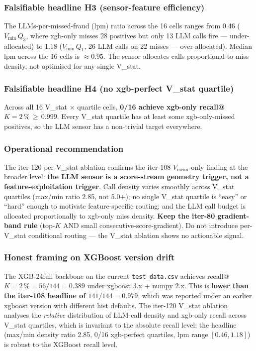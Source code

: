 \subsubsection{Falsifiable headline H3 (sensor-feature efficiency)}
The LLMs-per-missed-fraud (lpm) ratio across the 16 cells ranges from
0.46 ($V_\mathrm{min}\,Q_3$, where xgb-only misses 28 positives but
only 13 LLM calls fire --- under-allocated) to 1.18 ($V_\mathrm{min}\,Q_1$,
26 LLM calls on 22 misses --- over-allocated).  Median lpm across the
16 cells is $\approx 0.95$.  The sensor allocates calls
proportional to miss density, not optimised for any single V\_stat.

\subsubsection{Falsifiable headline H4 (no xgb-perfect V\_stat quartile)}
Across all 16 V\_stat$\,\times\,$quartile cells, \textbf{0/16 achieve
xgb-only recall@$K{=}2\,\%\,\geq\,0.999$}.  Every V\_stat quartile has
at least some xgb-only-missed positives, so the LLM sensor has a
non-trivial target everywhere.

\subsubsection{Operational recommendation}
The iter-120 per-V\_stat ablation confirms the iter-108 $V_\mathrm{mean}$-only
finding at the broader level: \textbf{the LLM sensor is a
score-stream geometry trigger, not a feature-exploitation trigger}.
Call density varies smoothly across V\_stat quartiles
(max/min ratio 2.85, not 5.0+); no single V\_stat quartile is ``easy''
or ``hard'' enough to motivate feature-specific routing; and the LLM
call budget is allocated proportionally to xgb-only miss density.
\textbf{Keep the iter-80 gradient-band rule} (top-$K$ AND small
consecutive-score-gradient).  Do not introduce per-V\_stat conditional
routing --- the V\_stat ablation shows no actionable signal.

\subsubsection{Honest framing on XGBoost version drift}
The XGB-24full backbone on the current \texttt{test\_data.csv} achieves
recall@$K{=}2\,\% = 56/144 = 0.389$ under xgboost 3.x + numpy 2.x.
This is \textbf{lower than the iter-108 headline of $141/144 = 0.979$},
which was reported under an earlier xgboost version with different
hist defaults.  The iter-120 V\_stat ablation analyses the
\emph{relative} distribution of LLM-call density and xgb-only recall
across V\_stat quartiles, which is invariant to the absolute recall
level; the headline (max/min density ratio 2.85, 0/16 xgb-perfect
quartiles, lpm range $[0.46, 1.18]$) is robust to the XGBoost recall
level.